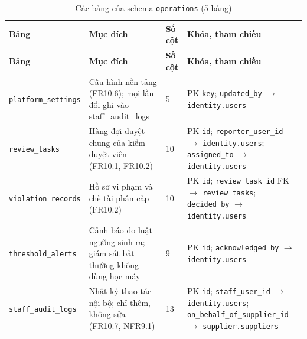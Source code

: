 \begingroup
\tblsetup\footnotesize\renewcommand{\arraystretch}{1.1}
\begin{longtable}{L{3.20cm} L{5.60cm} L{1.10cm} L{5.00cm}}
\caption{Các bảng của schema \texttt{operations} (5 bảng)}
\label{tab:db-operations} \\
\toprule
{}
\textbf{Bảng} & \textbf{Mục đích} & \textbf{Số cột} & \textbf{Khóa, tham chiếu} \\
\midrule
\endfirsthead
\toprule
{}
\textbf{Bảng} & \textbf{Mục đích} & \textbf{Số cột} & \textbf{Khóa, tham chiếu} \\
\midrule
\endhead
\bottomrule
\endfoot
\texttt{platform\_\allowbreak{}settings} & Cấu hình nền tảng (FR10.6); mọi lần đổi ghi vào staff\_audit\_logs & 5 & PK \texttt{key}; \texttt{updated\_\allowbreak{}by} $\to$ \texttt{identity.users} \\
\texttt{review\_\allowbreak{}tasks} & Hàng đợi duyệt chung của kiểm duyệt viên (FR10.1, FR10.2) & 10 & PK \texttt{id}; \texttt{reporter\_\allowbreak{}user\_\allowbreak{}id} $\to$ \texttt{identity.users}; \texttt{assigned\_\allowbreak{}to} $\to$ \texttt{identity.users} \\
\texttt{violation\_\allowbreak{}records} & Hồ sơ vi phạm và chế tài phân cấp (FR10.2) & 10 & PK \texttt{id}; \texttt{review\_\allowbreak{}task\_\allowbreak{}id} FK $\to$ \texttt{review\_\allowbreak{}tasks}; \texttt{decided\_\allowbreak{}by} $\to$ \texttt{identity.users} \\
\texttt{threshold\_\allowbreak{}alerts} & Cảnh báo do luật ngưỡng sinh ra; giám sát bất thường không dùng học máy & 9 & PK \texttt{id}; \texttt{acknowledged\_\allowbreak{}by} $\to$ \texttt{identity.users} \\
\texttt{staff\_\allowbreak{}audit\_\allowbreak{}logs} & Nhật ký thao tác nội bộ; chỉ thêm, không sửa (FR10.7, NFR9.1) & 13 & PK \texttt{id}; \texttt{staff\_\allowbreak{}user\_\allowbreak{}id} $\to$ \texttt{identity.users}; \texttt{on\_\allowbreak{}behalf\_\allowbreak{}of\_\allowbreak{}supplier\_\allowbreak{}id} $\to$ \texttt{supplier.suppliers} \\
\end{longtable}
\endgroup

